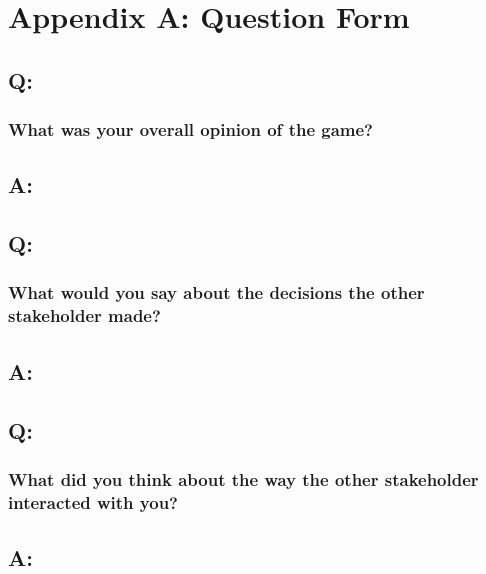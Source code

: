 \chapter{Appendix A: Question Form}

\section*{Q:}
\subsection*{What was your overall opinion of the game?}

\section*{A:}
\subsection*{}

\section*{Q:} 
\subsection*{What would you say about the decisions the other stakeholder made?}

\section*{A:}
\subsection*{}

\section*{Q:}
\subsection*{What did you think about the way the other stakeholder interacted with you?}

\section*{A:}
\subsection*{}

